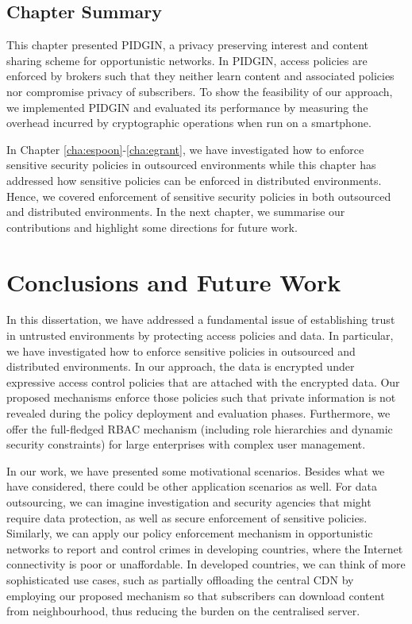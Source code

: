 \documentclass[epsfig,a4paper,11pt,titlepage]{book}
\numberwithin{algorithm}{chapter}
\begin{document}
\section{Chapter Summary}
\label{sec:pidgin-summary}

This chapter presented \gls{PIDGIN}, a privacy preserving interest and content sharing scheme for opportunistic networks. In \gls{PIDGIN}, access policies are enforced by brokers such that they neither learn content and associated policies nor compromise privacy of subscribers. To show the feasibility of our approach, we implemented \gls{PIDGIN} and evaluated its performance by measuring the overhead incurred by cryptographic operations when run on a smartphone.

In Chapter \ref{cha:espoon}-\ref{cha:egrant}, we have investigated how to enforce sensitive security policies in outsourced environments while this chapter has addressed how sensitive policies can be enforced in distributed environments. Hence, we covered enforcement of sensitive security policies in both outsourced and distributed environments. In the next chapter, we summarise our contributions and highlight some directions for future work.








\chapter{Conclusions and Future Work}
\label{cha:conclusion}





In this dissertation, we have addressed a fundamental issue of establishing trust in untrusted environments by protecting access policies and data. In particular, we have investigated how to enforce sensitive policies in outsourced and distributed environments. In our approach, the data is encrypted under expressive access control policies that are attached with the encrypted data. Our proposed mechanisms enforce those policies such that private information is not revealed during the policy deployment and evaluation phases. Furthermore, we offer the full-fledged \gls{RBAC} mechanism (including role hierarchies and dynamic security constraints) for large enterprises with complex user management.

In our work, we have presented some motivational scenarios. Besides what we have considered, there could be other application scenarios as well. For data outsourcing, we can imagine investigation and security agencies that might require data protection, as well as secure enforcement of sensitive policies. Similarly, we can apply our policy enforcement mechanism in opportunistic networks to report and control crimes in developing countries, where the Internet connectivity is poor or unaffordable. In developed countries, we can think of more sophisticated use cases, such as partially offloading the central \gls{CDN} by employing our proposed mechanism so that subscribers can download content from neighbourhood, thus reducing the burden on the centralised server.
\end{document}
